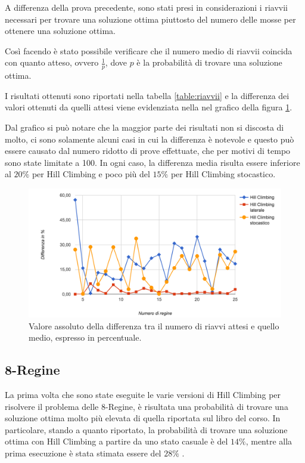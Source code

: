 A differenza della prova precedente, sono stati presi in considerazioni i riavvii necessari per trovare una soluzione ottima piuttosto del numero delle mosse per ottenere una soluzione ottima.

Così facendo è stato possibile verificare che il numero medio di riavvii coincida con quanto atteso, ovvero $\frac{1}{p}$, dove $p$ è la probabilità di trovare una soluzione ottima.

I risultati ottenuti sono riportati nella tabella \ref{table:riavvii} e la differenza dei valori ottenuti da quelli attesi viene evidenziata nella nel grafico della figura \ref{fig:riavvii}.

Dal grafico si può notare che la maggior parte dei risultati non si discosta di molto, ci sono solamente alcuni casi in cui la differenza è notevole e questo può essere causato dal numero ridotto di prove effettuate, che per motivi di tempo sono state limitate a 100.
In ogni caso, la differenza media risulta essere inferiore al $20\%$ per Hill Climbing e poco più del $15\%$ per Hill Climbing stocastico.



\begin{figure}[ht]
\centering
\includegraphics[width=\textwidth]{./immagini/diff-riavvii.png}
\caption{Valore assoluto della differenza tra il numero di riavvi attesi e quello medio, espresso in percentuale.}
\label{fig:riavvii}
\end{figure}

\FloatBarrier
\subsection{8-Regine}\label{prove:8regine}

La prima volta che sono state eseguite le varie versioni di Hill Climbing per risolvere il problema delle $8$-Regine, è risultata una probabilità di trovare una soluzione ottima molto più elevata di quella riportata sul libro del corso.
In particolare, stando a quanto riportato, la probabilità di trovare una soluzione ottima con Hill Climbing a partire da uno stato casuale è del $14\%$, mentre alla prima esecuzione è stata stimata essere del $28\%$ .

